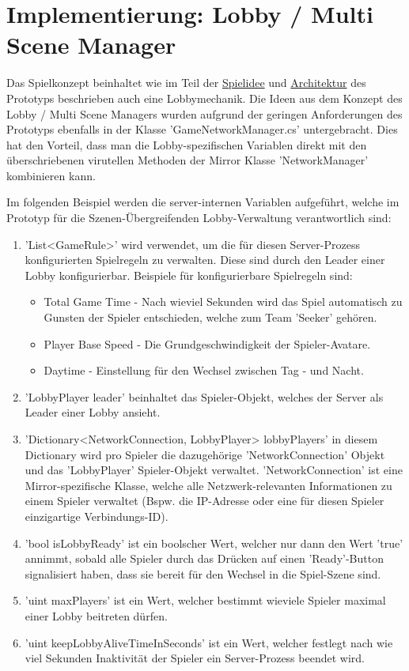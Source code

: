 \section{Implementierung: Lobby / Multi Scene Manager}
\label{Lobby Manager Implementierung}

Das Spielkonzept beinhaltet wie im Teil der \hyperref[Spielidee]{Spielidee} und \hyperref[Architektur]{Architektur} des Prototyps beschrieben auch eine Lobbymechanik. Die Ideen aus dem Konzept des Lobby / Multi Scene Managers wurden aufgrund der geringen Anforderungen des Prototyps ebenfalls in der Klasse 'GameNetworkManager.cs' untergebracht. Dies hat den Vorteil, dass man die Lobby-spezifischen Variablen direkt mit den überschriebenen virutellen Methoden der Mirror Klasse 'NetworkManager' kombinieren kann.

Im folgenden Beispiel werden die server-internen Variablen aufgeführt, welche im Prototyp für die Szenen-Übergreifenden Lobby-Verwaltung verantwortlich sind:
    
\begin{enumerate}
	\item 'List<GameRule>' wird verwendet, um die für diesen Server-Prozess konfigurierten Spielregeln zu verwalten. Diese sind durch den Leader einer Lobby konfigurierbar. Beispiele für konfigurierbare Spielregeln sind:
	\begin{itemize}
		\item Total Game Time - Nach wieviel Sekunden wird das Spiel automatisch zu Gunsten der Spieler entschieden, welche zum Team 'Seeker' gehören.
		\item Player Base Speed - Die Grundgeschwindigkeit der Spieler-Avatare.
		\item Daytime - Einstellung für den Wechsel zwischen Tag - und Nacht.
	\end{itemize}
	\item 'LobbyPlayer leader' beinhaltet das Spieler-Objekt, welches der Server als Leader einer Lobby ansieht.
	\item 'Dictionary<NetworkConnection, LobbyPlayer> lobbyPlayers' in diesem Dictionary wird pro Spieler die dazugehörige 'NetworkConnection' Objekt und das 'LobbyPlayer' Spieler-Objekt verwaltet. 'NetworkConnection' ist eine Mirror-spezifische Klasse, welche alle Netzwerk-relevanten Informationen zu einem Spieler verwaltet (Bspw. die IP-Adresse oder eine für diesen Spieler einzigartige Verbindungs-ID).
	\item 'bool isLobbyReady' ist ein boolscher Wert, welcher nur dann den Wert 'true' annimmt, sobald alle Spieler durch das Drücken auf einen 'Ready'-Button signalisiert haben, dass sie bereit für den Wechsel in die Spiel-Szene sind.
	\item 'uint maxPlayers' ist ein Wert, welcher bestimmt wieviele Spieler maximal einer Lobby beitreten dürfen.
	\item 'uint keepLobbyAliveTimeInSeconds' ist ein Wert, welcher festlegt nach wie viel Sekunden Inaktivität der Spieler ein Server-Prozess beendet wird.
\end{enumerate}

